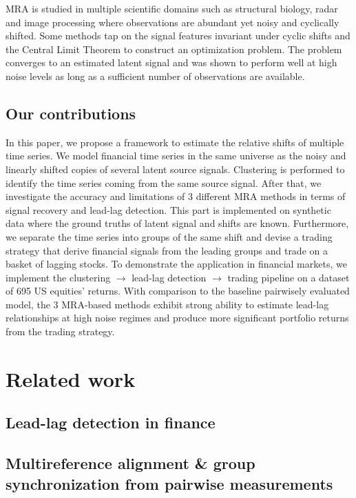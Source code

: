 \documentclass[sigconf]{acmart}
\begin{document}
MRA is studied in multiple scientific domains such as structural biology, radar and image processing where observations are abundant yet noisy and cyclically shifted. Some methods tap on the signal features invariant under cyclic shifts and the Central Limit Theorem to construct an optimization problem\cite{Boumal2017Oct}. The problem converges to an estimated latent signal and was shown to perform well at high noise levels as long as a sufficient number of observations are available. 

\subsection{Our contributions}
    
In this paper, we propose a framework to estimate the relative shifts of multiple time series. We model financial time series in the same universe as the noisy and linearly shifted copies of several latent source signals. Clustering is performed to identify the time series coming from the same source signal. After that, we investigate the accuracy and limitations of 3 different MRA methods in terms of signal recovery and lead-lag detection. This part is implemented on synthetic data where the ground truths of latent signal and shifts are known. Furthermore, we separate the time series into groups of the same shift and devise a trading strategy that derive financial signals from the leading groups and trade on a basket of lagging stocks. To demonstrate the application in financial markets, we implement the clustering $\rightarrow$ lead-lag detection $\rightarrow$ trading pipeline on a dataset of 695 US equities' returns. With comparison to the baseline pairwisely evaluated model, the 3 MRA-based methods exhibit strong ability to estimate lead-lag relationships at high noise regimes and produce more significant portfolio returns from the trading strategy.



\section{Related work}

\subsection{Lead-lag detection in finance}

\subsection{Multireference alignment \&   group synchronization from pairwise measurements}
\end{document}
